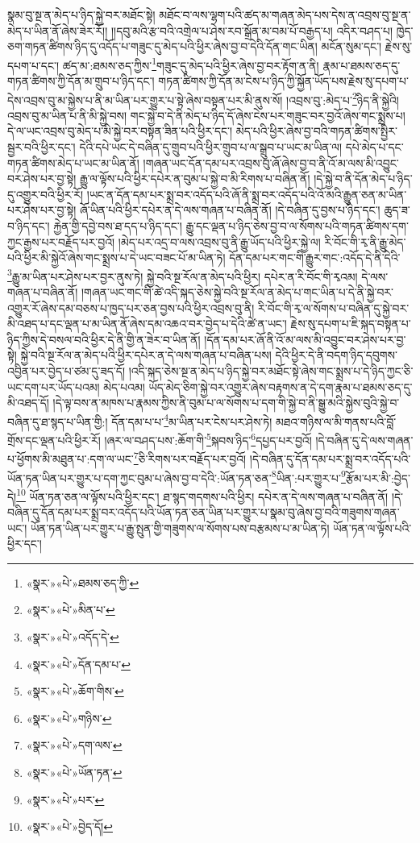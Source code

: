 སྣམ་བུ་སྔ་ན་མེད་པ་ཉིད་སྐྱེ་བར་མཐོང་སྟེ། མཐོང་བ་ལས་ལྷག་པའི་ཚད་མ་གཞན་མེད་པས་དེས་ན་འབྲས་བུ་སྔ་ན་མེད་པ་ཡིན་ནོ་ཞེས་ཟེར་རོ།། །།དབུ་མའི་རྩ་བའི་འགྲེལ་པ་ཤེས་རབ་སྒྲོན་མ་བམ་པོ་བརྒྱད་པ། འདིར་བཤད་པ། ཁྱེད་ཅག་གཏན་ཚིགས་ཉིད་དུ་འདོད་པ་གཟུང་དུ་མེད་པའི་ཕྱིར་ཞེས་བྱ་བ་དེའི་དོན་གང་ཡིན། མངོན་སུམ་དང་། རྗེས་སུ་དཔག་པ་དང་། ཚད་མ་:ཐམས་ཅད་ཀྱིས་\footnote{«སྣར་»«པེ་»ཐམས་ཅད་ཀྱི་}གཟུང་དུ་མེད་པའི་ཕྱིར་ཞེས་བྱ་བར་རྟོག་ན་ནི། རྣམ་པ་ཐམས་ཅད་དུ་གཏན་ཚིགས་ཀྱི་དོན་མ་གྲུབ་པ་ཉིད་དང་། གཏན་ཚིགས་ཀྱི་དོན་མ་ངེས་པ་ཉིད་ཀྱི་སྐྱོན་ཡོད་པས་རྗེས་སུ་དཔག་པ་དེས་འབྲས་བུ་མ་སྐྱེས་པ་ནི་མ་ཡིན་པར་གྱུར་པ་སྟེ་ཞེས་བསྟན་པར་མི་ནུས་སོ། །འབྲས་བུ་:མེད་པ་\footnote{«སྣར་»«པེ་»མིན་པ་}ཉིད་ནི་སྐྱེའི། འབྲས་བུ་མ་ཡིན་པ་ནི་མི་སྐྱེ་བས། གང་སྐྱེ་བ་དེ་ནི་མེད་པ་ཉིད་དོ་ཞེས་ངེས་པར་གཟུང་བར་བྱའོ་ཞེས་གང་སྨྲས་པ། དེ་ལ་ཡང་འབྲས་བུ་མེད་པ་མི་སྐྱེ་བར་བསྟན་ཟིན་པའི་ཕྱིར་དང་། མེད་པའི་ཕྱིར་ཞེས་བྱ་བའི་གཏན་ཚིགས་སྤྱིར་སྦྱར་བའི་ཕྱིར་དང་། དེའི་དཔེ་ཡང་དེ་བཞིན་དུ་གྲུབ་པའི་ཕྱིར་གྲུབ་པ་ལ་སྒྲུབ་པ་ཡང་མ་ཡིན་ལ། དཔེ་མེད་པ་དང་གཏན་ཚིགས་མེད་པ་ཡང་མ་ཡིན་ནོ། །གཞན་ཡང་དོན་དམ་པར་འབྲས་བུ་ཞོ་ཞེས་བྱ་བ་ནི་འོ་མ་ལས་མི་འབྱུང་བར་ཤེས་པར་བྱ་སྟེ། རྒྱུ་ལ་ལྟོས་པའི་ཕྱིར་དཔེར་ན་བུམ་པ་སྐྱེ་བ་མི་རིགས་པ་བཞིན་ནོ། །དེ་སྐྱེ་བ་ནི་དོན་མེད་པ་ཉིད་དུ་འགྱུར་བའི་ཕྱིར་རོ། །ཡང་ན་དོན་དམ་པར་སྨྲ་བར་འདོད་པའི་ཞོ་ནི་སྨྲ་བར་འདོད་པའི་འོ་མའི་རྒྱུན་ཅན་མ་ཡིན་པར་ཤེས་པར་བྱ་སྟེ། ཞོ་ཡིན་པའི་ཕྱིར་དཔེར་ན་དེ་ལས་གཞན་པ་བཞིན་ནོ། །དེ་བཞིན་དུ་བྱས་པ་ཉིད་དང་། ཆུད་ཟ་བ་ཉིད་དང་། རྐྱེན་གྱི་དབྱེ་བས་ཐ་དད་པ་ཉིད་དང་། རྒྱུ་དང་ལྡན་པ་ཉིད་ཅེས་བྱ་བ་ལ་སོགས་པའི་གཏན་ཚིགས་དག་ཀྱང་རྒྱས་པར་བརྗོད་པར་བྱའོ། །མེད་པར་འདྲ་བ་ལས་འབྲས་བུ་ནི་རྒྱུ་ཡོད་པའི་ཕྱིར་སྐྱེ་ལ། རི་བོང་གི་རྭ་ནི་རྒྱུ་མེད་པའི་ཕྱིར་མི་སྐྱེའོ་ཞེས་གང་སྨྲས་པ་དེ་ཡང་བཟང་པོ་མ་ཡིན་ཏེ། དོན་དམ་པར་གང་གི་རྒྱུར་གང་:འདོད་དེ་ནི་དེའི་\footnote{«སྣར་»«པེ་»འདོད་དེ་}རྒྱུ་མ་ཡིན་པར་ཤེས་པར་བྱར་ནུས་ཏེ། སྐྱེ་བའི་སྔ་རོལ་ན་མེད་པའི་ཕྱིར། དཔེར་ན་རི་བོང་གི་རྭའམ། དེ་ལས་གཞན་པ་བཞིན་ནོ། །གཞན་ཡང་གང་གི་ཚེ་འདི་སྐད་ཅེས་སྐྱེ་བའི་སྔ་རོལ་ན་མེད་པ་གང་ཡིན་པ་དེ་ནི་སྐྱེ་བར་འགྱུར་རོ་ཞེས་དམ་བཅས་པ་ཁྱད་པར་ཅན་བྱས་པའི་ཕྱིར་འབྲས་བུ་ནི། རི་བོང་གི་རྭ་ལ་སོགས་པ་བཞིན་དུ་སྐྱེ་བར་མི་འཐད་པ་དང་ལྡན་པ་མ་ཡིན་ནོ་ཞེས་དམ་འཆའ་བར་བྱེད་པ་དེའི་ཚེ་ན་ཡང་། རྗེས་སུ་དཔག་པ་ཇི་སྐད་བསྟན་པ་ཉིད་ཀྱིས་དེ་བསལ་བའི་ཕྱིར་དེ་ནི་གྱི་ན་ཟེར་བ་ཡིན་ནོ། །དོན་དམ་པར་ཞོ་ནི་འོ་མ་ལས་མི་འབྱུང་བར་ཤེས་པར་བྱ་སྟེ། སྐྱེ་བའི་སྔ་རོལ་ན་མེད་པའི་ཕྱིར་དཔེར་ན་དེ་ལས་གཞན་པ་བཞིན་པས། དེའི་ཕྱིར་དེ་ནི་བདག་ཉིད་དབུགས་འབྱིན་པར་བྱེད་པ་ཙམ་དུ་ཟད་དོ། །འདི་སྐད་ཅེས་སྔ་ན་མེད་པ་ཉིད་སྐྱེ་བར་མཐོང་སྟེ་ཞེས་གང་སྨྲས་པ་དེ་ཉིད་ཀྱང་ཅི་ཡང་དག་པར་ཡོད་པའམ། མེད་པའམ། ཡོད་མེད་ཅིག་སྐྱེ་བར་འགྱུར་ཞེས་བརྟགས་ན་དེ་དག་རྣམ་པ་ཐམས་ཅད་དུ་མི་འཐད་དོ། །དེ་ལྟ་བས་ན་མཁས་པ་རྣམས་ཀྱིས་ནི་བུམ་པ་ལ་སོགས་པ་དག་གི་སྐྱེ་བ་ནི་སྒྱུ་མའི་སྐྱེས་བུའི་སྐྱེ་བ་བཞིན་དུ་ཐ་སྙད་པ་ཡིན་གྱི:། དོན་དམ་པ་པ་\footnote{«སྣར་»«པེ་»དོན་དམ་པ་}མ་ཡིན་པར་ངེས་པར་ཤེས་ཏེ། མཐའ་གཉིས་ལ་མི་གནས་པའི་བློ་གྲོས་དང་ལྡན་པའི་ཕྱིར་རོ། །ཞར་ལ་བཤད་པས་:ཆོག་གི་\footnote{«སྣར་»«པེ་»ཆོག་གིས་}སྐབས་ཉིད་\footnote{«སྣར་»«པེ་»གཉིས་}དཔྱད་པར་བྱའོ། །དེ་བཞིན་དུ་དེ་ལས་གཞན་པ་ཕྱོགས་མི་མཐུན་པ་:དག་ལ་ཡང་\footnote{«སྣར་»«པེ་»དག་ལས་}ཅི་རིགས་པར་བརྗོད་པར་བྱའོ། །དེ་བཞིན་དུ་དོན་དམ་པར་སྨྲ་བར་འདོད་པའི་ཡོན་ཏན་ཡིན་པར་གྱུར་པ་དག་ཀྱང་བུམ་པ་ཞེས་བྱ་བ་དེའི་:ཡོན་ཏན་ཅན་\footnote{«སྣར་»«པེ་»ཡོན་ཏན་}ཡིན་:པར་གྱུར་པ་\footnote{«སྣར་»«པེ་»པར་}རྩོམ་པར་མི་:བྱེད་དེ།\footnote{«སྣར་»«པེ་»བྱེད་དོ།} ཡོན་ཏན་ཅན་ལ་ལྟོས་པའི་ཕྱིར་དང་། ཐ་སྙད་གདགས་པའི་ཕྱིར། དཔེར་ན་དེ་ལས་གཞན་པ་བཞིན་ནོ། །དེ་བཞིན་དུ་དོན་དམ་པར་སྨྲ་བར་འདོད་པའི་ཡོན་ཏན་ཅན་ཡིན་པར་གྱུར་པ་སྣམ་བུ་ཞེས་བྱ་བའི་གཟུགས་གཞན་ཡང་། ཡོན་ཏན་ཡིན་པར་གྱུར་པ་རྒྱུ་སྤུན་གྱི་གཟུགས་ལ་སོགས་པས་བརྩམས་པ་མ་ཡིན་ཏེ། ཡོན་ཏན་ལ་ལྟོས་པའི་ཕྱིར་དང་། 